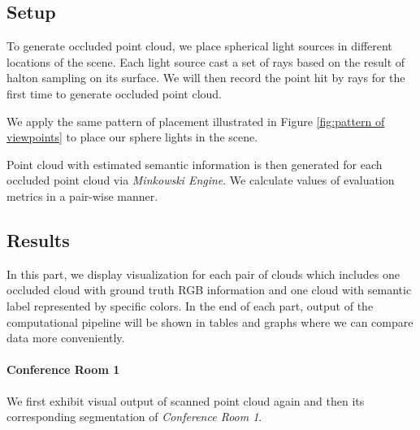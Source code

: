 \documentclass[11pt, a4paper,oneside,chapterprefix=false]{scrbook}
\begin{document}
\subsection{Setup}

To generate occluded point cloud, we place spherical light sources in different locations of the scene. Each light source cast a set of rays based on the result of halton sampling on its surface. We will then record the point hit by rays for the first time to generate occluded point cloud.

\vspace{10pt}

We apply the same pattern of placement illustrated in Figure \ref{fig:pattern of viewpoints} to place our sphere lights in the scene. 

\vspace{10pt}

Point cloud with estimated semantic information is then generated for each occluded point cloud via \emph{Minkowski Engine}. We calculate values of evaluation metrics in a pair-wise manner.


\subsection{Results}

In this part, we display visualization for each pair of clouds which includes one occluded cloud with ground truth RGB information and one cloud with semantic label represented by specific colors. In the end of each part, output of the computational pipeline will be shown in tables and graphs where we can compare data more conveniently.

\paragraph{Conference Room 1} \label{par:corre conf1}

We first exhibit visual output of scanned point cloud again and then its corresponding segmentation of \emph{Conference Room 1}.
\end{document}
